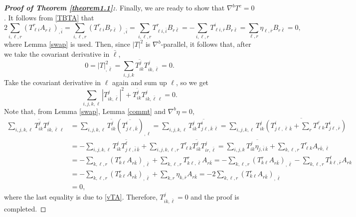 \documentclass{amsart}
\numberwithin{equation}{section}
\theoremstyle{definition}
\renewcommand{\1}{\mathds{1}}
\renewcommand{\>}{\rightarrow}
\begin{document}
\begin{proof}[{\bf Proof of Theorem \ref{theorem1.1}:}]
Finally, we are ready to show that $\nabla^b T^c=0$.
It follows from \eqref{TBTA} that
\begin{equation}\label{vTA}
 2\sum_{i,\ell,r} \left(T^r_{\ell i} A_{r \bar{\ell}}\right)_{,\bar{i}}
= \sum_{i,\ell,r} \left(T^r_{\ell i}B_{r \bar{\ell}}\right)_{,\bar{i}}
= \sum_{i,\ell,r} T^r_{\ell i,\bar{i}}B_{r \bar{\ell}}
= - \sum_{i,\ell,r} T^i_{\ell i,\bar{r}}B_{r \bar{\ell}}
=  \sum_{\ell,r} \eta_{\ell,\bar{r}}B_{r \bar{\ell}}=0,
\end{equation}
where Lemma \ref{swap} is used.
Then, since $|T|^2$ is $\nabla^b$-parallel, it follows that, after we take the covariant derivative in $\bar{\ell}$,
\[0=|T|^2_{,\bar{\ell}}=\sum_{i,j,k}\overline{T^j_{ik}}T^j_{ik,\bar{\ell}} =0.\]
Take the covariant derivative in $\ell$ again and sum up $\ell$, so we get
\[\sum_{i,j,k,\ell} |T^j_{ik,\bar{\ell}}|^2 + \overline{T^j_{ik}}T^j_{ik,\bar{\ell}\,\ell} =0.\]
Note that, from Lemma \ref{swap}, Lemma \ref{commt} and $\nabla^b \eta=0$,
\[\begin{aligned}
\sum_{i,j,k,\ell} \overline{T^j_{ik}}T^j_{ik,\bar{\ell}\,\ell}& =
\sum_{i,j,k,\ell} \overline{T^j_{ik}} \left(\overline{T_{j \ell,\bar{k}}^i}\right)_{,\ell}
= \sum_{i,j,k,\ell} \overline{T^j_{ik} T_{j \ell,\bar{k}\,\bar{\ell}}^i}
= \sum_{i,j,k,\ell} \overline{T^j_{ik}( T_{j \ell,\bar{\ell}\,\bar{k}}^i +  \sum_r \overline{T^r_{\ell k}} T^i_{j \ell, \bar{r}} )} \\
&= - \sum_{i,j,k,\ell} \overline{T^j_{ik} T^{\ell}_{j \ell, \bar{i}\,\bar{k}}}
+  \sum_{i,j,k,\ell,r} T^r_{\ell k} \overline{T^j_{ik}} T^j_{ir,\bar{\ell}}
= \sum_{i,j,k} \overline{T^j_{ik}\eta_{j,\bar{i}\,\bar{k}}}
+  \sum_{k,\ell,r} T^r_{\ell k}A_{r\bar{k},\bar{\ell}} \\
&= - \sum_{k,\ell,r} \left( T^r_{k \ell}A_{r\bar{k}} \right)_{,\bar{\ell}}
+ \sum_{k,\ell,r} T^r_{k \ell, \bar{\ell}} A_{r\bar{k}}
= - \sum_{k,\ell,r} \left( T^r_{k \ell}A_{r\bar{k}} \right)_{,\bar{\ell}}
- \sum_{k,\ell,r} T_{k \ell,\bar{r}}^\ell A_{rk} \\
&= - \sum_{k,\ell,r} \left( T^r_{k \ell}A_{r\bar{k}} \right)_{,\bar{\ell}}
+ \sum_{k,r} \eta_{k,\bar{r}}A_{r\bar{k}}
=-2 \sum_{k,\ell,r} \left( T^r_{k \ell}A_{r\bar{k}} \right)_{,\bar{\ell}} \\
&=0,
\end{aligned}\]
where the last equality is due to \eqref{vTA}. Therefore, $T^j_{ik,\bar{\ell}}=0$ and the proof is completed.
\end{proof}

\vspace{0.4cm}
\end{document}

